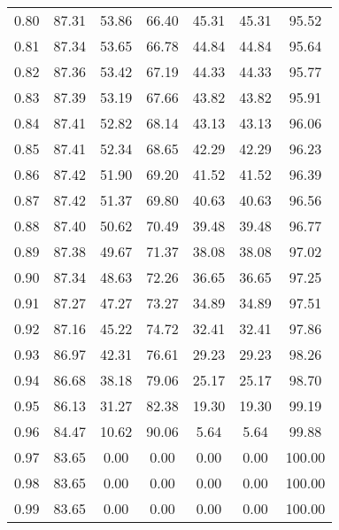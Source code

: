 \begin{tabular}{|c|c|c|c|c|c|c|}
      0.80 &     87.31 &     53.86 &      66.40 &   45.31 &      45.31 &         95.52 \\
      0.81 &     87.34 &     53.65 &      66.78 &   44.84 &      44.84 &         95.64 \\
      0.82 &     87.36 &     53.42 &      67.19 &   44.33 &      44.33 &         95.77 \\
      0.83 &     87.39 &     53.19 &      67.66 &   43.82 &      43.82 &         95.91 \\
      0.84 &     87.41 &     52.82 &      68.14 &   43.13 &      43.13 &         96.06 \\
      0.85 &     87.41 &     52.34 &      68.65 &   42.29 &      42.29 &         96.23 \\
      0.86 &     87.42 &     51.90 &      69.20 &   41.52 &      41.52 &         96.39 \\
      0.87 &     87.42 &     51.37 &      69.80 &   40.63 &      40.63 &         96.56 \\
      0.88 &     87.40 &     50.62 &      70.49 &   39.48 &      39.48 &         96.77 \\
      0.89 &     87.38 &     49.67 &      71.37 &   38.08 &      38.08 &         97.02 \\
      0.90 &     87.34 &     48.63 &      72.26 &   36.65 &      36.65 &         97.25 \\
      0.91 &     87.27 &     47.27 &      73.27 &   34.89 &      34.89 &         97.51 \\
      0.92 &     87.16 &     45.22 &      74.72 &   32.41 &      32.41 &         97.86 \\
      0.93 &     86.97 &     42.31 &      76.61 &   29.23 &      29.23 &         98.26 \\
      0.94 &     86.68 &     38.18 &      79.06 &   25.17 &      25.17 &         98.70 \\
      0.95 &     86.13 &     31.27 &      82.38 &   19.30 &      19.30 &         99.19 \\
      0.96 &     84.47 &     10.62 &      90.06 &    5.64 &       5.64 &         99.88 \\
      0.97 &     83.65 &      0.00 &       0.00 &    0.00 &       0.00 &        100.00 \\
      0.98 &     83.65 &      0.00 &       0.00 &    0.00 &       0.00 &        100.00 \\
      0.99 &     83.65 &      0.00 &       0.00 &    0.00 &       0.00 &        100.00 \\
\bottomrule
\end{tabular}
